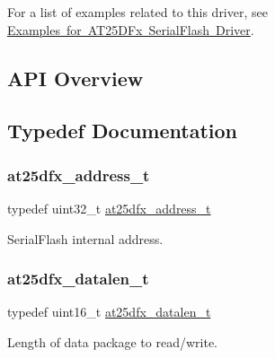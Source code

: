 For a list of examples related to this driver, see \mbox{\hyperlink{asfdoc_common2_at25dfx_exqsg}{Examples for A\+T25\+D\+Fx Serial\+Flash Driver}}.\hypertarget{group__asfdoc__common2__at25dfx__group_asfdoc_common2_at25dfx_api_overview}{}\subsection{A\+P\+I Overview}\label{group__asfdoc__common2__at25dfx__group_asfdoc_common2_at25dfx_api_overview}


\subsection{Typedef Documentation}
\mbox{\label{group__asfdoc__common2__at25dfx__group_ga6797a814b041014cef23de480c9da9ef}} 
\subsubsection{\texorpdfstring{at25dfx\_address\_t}{at25dfx\_address\_t}}
{\footnotesize\ttfamily typedef uint32\+\_\+t \mbox{\hyperlink{group__asfdoc__common2__at25dfx__group_ga6797a814b041014cef23de480c9da9ef}{at25dfx\+\_\+address\+\_\+t}}}

Serial\+Flash internal address. \mbox{\label{group__asfdoc__common2__at25dfx__group_gaebf176d512c4cc61390aef7159ddccb9}} 
\subsubsection{\texorpdfstring{at25dfx\_datalen\_t}{at25dfx\_datalen\_t}}
{\footnotesize\ttfamily typedef uint16\+\_\+t \mbox{\hyperlink{group__asfdoc__common2__at25dfx__group_gaebf176d512c4cc61390aef7159ddccb9}{at25dfx\+\_\+datalen\+\_\+t}}}

Length of data package to read/write. \mbox{\label{group__asfdoc__common2__at25dfx__group_ga78981ccb6b863d6548f343fe01792406}} 
